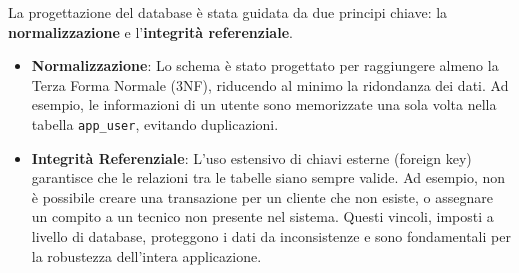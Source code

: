 La progettazione del database è stata guidata da due principi chiave: la \textbf{normalizzazione} e l'\textbf{integrità referenziale}.
\begin{itemize}
    \item \textbf{Normalizzazione}: Lo schema è stato progettato per raggiungere almeno la Terza Forma Normale (3NF), riducendo al minimo la ridondanza dei dati. Ad esempio, le informazioni di un utente sono memorizzate una sola volta nella tabella \texttt{app\_user}, evitando duplicazioni.
    \item \textbf{Integrità Referenziale}: L'uso estensivo di chiavi esterne (foreign key) garantisce che le relazioni tra le tabelle siano sempre valide. Ad esempio, non è possibile creare una transazione per un cliente che non esiste, o assegnare un compito a un tecnico non presente nel sistema. Questi vincoli, imposti a livello di database, proteggono i dati da inconsistenze e sono fondamentali per la robustezza dell'intera applicazione.
\end{itemize}
